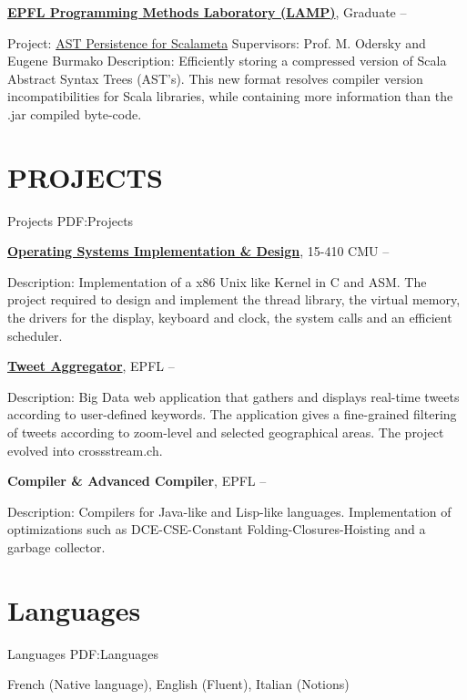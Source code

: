 \documentclass[a4paper,10pt,oneside]{article}
\begin{document}
\begin{body}
\EntryGap
\href{http://lamp.epfl.ch/}
{\textbf{EPFL Programming Methods Laboratory (LAMP)}},
Graduate
\hfill
{} --
\begin{detail}
\BulletItem
Project:
\href{http://infoscience.epfl.ch/record/200050?ln=en}
{AST Persistence for Scalameta}
\BulletItem
Supervisors:
Prof. M. Odersky and 
Eugene Burmako
\BulletItem
Description:
Efficiently storing a compressed version of Scala Abstract Syntax Trees (AST's).
This new format resolves compiler version incompatibilities for Scala libraries, while containing more information than the .jar compiled byte-code.
\end{detail}


\section
{PROJECTS}
{Projects}
{PDF:Projects}

\href{https://www.cs.cmu.edu/~410/}
{\textbf{Operating Systems Implementation \& Design}}, 15-410 CMU
\hfill
{} --
\begin{detail}
\BulletItem
Description:
Implementation of a x86 Unix like Kernel in C and ASM. The project required to design and implement the thread library, the virtual memory, the drivers for the display, keyboard and clock, the system calls and an efficient scheduler.
\end{detail}

\EntryGap
\href{http://crossstream.ch/}
{\textbf{Tweet Aggregator}}, EPFL
\hfill
{} --
\begin{detail}
\BulletItem
Description:
Big Data web application that gathers and displays real-time tweets according to user-defined keywords.
The application gives a fine-grained filtering of tweets according to zoom-level and selected geographical areas. The project evolved into crossstream.ch.
\end{detail}

\EntryGap
\textbf{Compiler \& Advanced Compiler}, EPFL
\hfill
{} --
\begin{detail}
\BulletItem
Description:
Compilers for Java-like and Lisp-like languages. Implementation of optimizations such as DCE-CSE-Constant Folding-Closures-Hoisting and a garbage collector.
\end{detail}

\hline

\section
{Languages}
{Languages}
{PDF:Languages}

French (Native language), English (Fluent), Italian (Notions)
\end{body}

\end{document}

